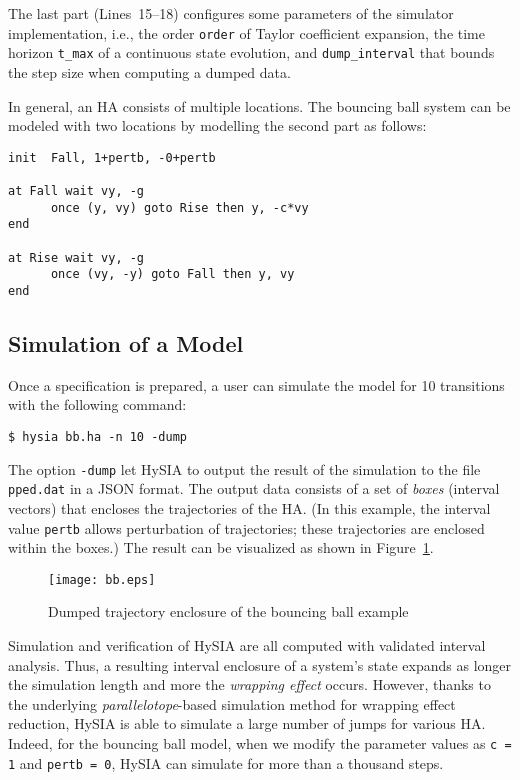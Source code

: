 \documentclass[12pt,a4paper]{article}
\begin{document}
The last part (Lines~15--18) configures some parameters of the simulator implementation, i.e., the order \verb|order| of Taylor coefficient expansion, the time horizon \verb|t_max| of a continuous state evolution, and \verb|dump_interval| that bounds the step size when computing a dumped data.

In general, an HA consists of multiple locations. The bouncing ball system can be modeled with two locations by modelling the second part as follows: %
\begin{lstlisting}
init  Fall, 1+pertb, -0+pertb

at Fall wait vy, -g
      once (y, vy) goto Rise then y, -c*vy
end

at Rise wait vy, -g
      once (vy, -y) goto Fall then y, vy
end
\end{lstlisting}

\subsection{Simulation of a Model}

Once a specification is prepared, a user can simulate the model for 10 transitions with the following command:
\begin{verbatim}
$ hysia bb.ha -n 10 -dump
\end{verbatim}
The option \verb|-dump| let HySIA to output the result of the simulation to the file \verb|pped.dat| in a JSON format.
The output data consists of a set of \emph{boxes} (interval vectors) that encloses the trajectories of the HA.
(In this example, the interval value \verb|pertb| allows perturbation of trajectories; these trajectories are enclosed within the boxes.)
The result can be visualized as shown in Figure~\ref{f:bb}.

\begin{figure}[t]
\centering
\texttt{[image: bb.eps]}
\caption{Dumped trajectory enclosure of the bouncing ball example}
\label{f:bb}
\end{figure}

Simulation and verification of HySIA are all computed with validated interval analysis.
Thus, a resulting interval enclosure of a system's state expands as longer the simulation length and more the \emph{wrapping effect} occurs.
However, thanks to the underlying \emph{parallelotope}-based simulation method for wrapping effect reduction, HySIA is able to simulate a large number of jumps for various HA.
Indeed, for the bouncing ball model, when we modify the parameter values as \verb|c = 1| and \verb|pertb = 0|, HySIA can simulate for more than a thousand steps.
\end{document}
